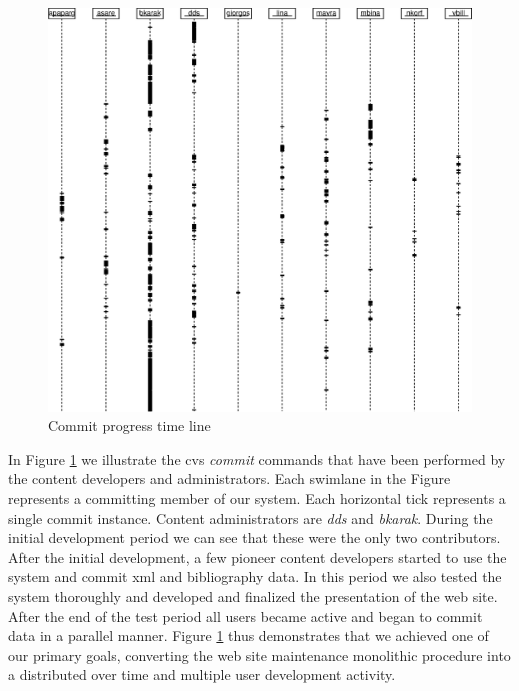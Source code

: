 \documentclass{elsart}
\begin{document}
\begin{figure}[h!]
\includegraphics[scale=0.6]{cvs-log.eps}
\caption{Commit progress time line}
\label{fig:cvs-log}
\end{figure}

In Figure \ref{fig:cvs-log} we illustrate the {\sc cvs} \textit{commit} commands that have been performed by
the content developers and administrators. Each swimlane in the Figure represents a committing
member of our system. Each horizontal tick represents a single commit instance.
Content administrators are \textit{dds} and \textit{bkarak}. 
During the initial development period we can see that these were the
only two contributors.
After the initial development, a few 
pioneer content developers started to use the system and commit {\sc xml} and bibliography data. In this period 
we also tested the system thoroughly and developed and finalized the presentation of the web site. After the end of
the test period all users became active and began to commit data in a parallel manner. Figure \ref{fig:cvs-log} 
thus demonstrates that we achieved one of our primary goals, converting the web site maintenance monolithic procedure 
into a distributed over time and multiple user development activity.
\end{document}
